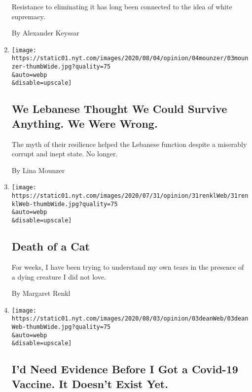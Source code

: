 \begin{enumerate}
  Resistance to eliminating it has long been connected to the idea of
  white supremacy.

  By Alexander Keyssar
\item
  \href{/2020/08/03/opinion/lebanon-coronavirus-economy.html}{}

  \texttt{[image: https://static01.nyt.com/images/2020/08/04/opinion/04mounzer/03mounzer-thumbWide.jpg?quality=75\\\&auto=webp\\\&disable=upscale]}

  \hypertarget{we-lebanese-thought-we-could-survive-anything-we-were-wrong}{%
  \subsection{We Lebanese Thought We Could Survive Anything. We Were
  Wrong.}\label{we-lebanese-thought-we-could-survive-anything-we-were-wrong}}

  The myth of their resilience helped the Lebanese function despite a
  miserably corrupt and inept state. No longer.

  By Lina Mounzer
\item
  \href{/2020/08/03/opinion/feral-cat-dying.html}{}

  \texttt{[image: https://static01.nyt.com/images/2020/07/31/opinion/31renklWeb/31renklWeb-thumbWide.jpg?quality=75\\\&auto=webp\\\&disable=upscale]}

  \hypertarget{death-of-a-cat}{%
  \subsection{Death of a Cat}\label{death-of-a-cat}}

  For weeks, I have been trying to understand my own tears in the
  presence of a dying creature I did not love.

  By Margaret Renkl
\item
  \href{/2020/08/03/opinion/coronavirus-vaccine-efficacy-trials.html}{}

  \texttt{[image: https://static01.nyt.com/images/2020/08/03/opinion/03deanWeb/03deanWeb-thumbWide.jpg?quality=75\\\&auto=webp\\\&disable=upscale]}

  \hypertarget{id-need-evidence-before-i-got-a-covid-19-vaccine-it-doesnt-exist-yet}{%
  \subsection{I'd Need Evidence Before I Got a Covid-19 Vaccine. It
  Doesn't Exist
  Yet.}\label{id-need-evidence-before-i-got-a-covid-19-vaccine-it-doesnt-exist-yet}}


\end{enumerate}
